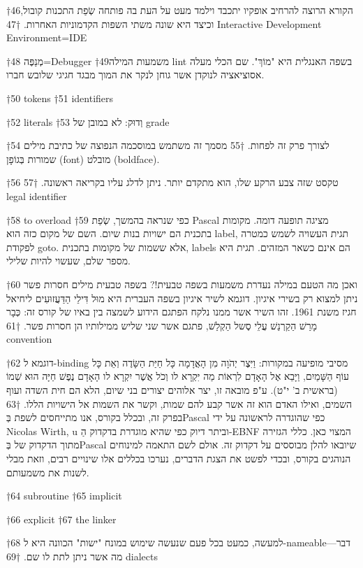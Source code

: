 †{46}הקורא הרוצה להרחיב אופקיו יתכבד וילמד מעט על העת בה פותחה שְׂפַת התכנות קובול, וכיצד היא שונה משתי השפות הקדמוניות האחרות.
†{47} Interactive Development Environment=IDE

†{48} מְנַפֶּה=Debugger
†{49}משמעות המילה lint בשפה האנגלית היא "מוֹךְ". שם הכלי מעלה אסוציאציה לנוקדן אשר גוחן לנקר את המוך מבגד חגיגי שלובש חברו.

†{50} tokens
†{51} identifiers

†{52} literals
†{53} וְדוּק: לא במובן של grade

†{54} לצורך פרק זה לפחות.
†{55} מסמך זה משתמש במוסכמה הנפוצה של כתיבת מילים שמורות בְּגוֹפָן (font) מובלט (boldface).

†{56} טקסט שזה צבע הרקע שלו, הוא מתקדם יותר. ניתן לדלג עליו בקריאה ראשונה.
†{57} legal identifier

†{58} to overload
†{59} כפי שנראה בהמשך, שְׂפַת Pascal מציגה תופעה דומה. מקומות בתכנית הם ישויות בנות שיום. השם של מקום כזה הוא label, תגית העשויה לשמש כמטרה לפקודת goto. אלא ששמות של מקומות בתכנית, labels הם אינם כשאר המזהים. תגית היא מספר שלם, שעשוי להיות שלילי.

†{60} ואכן מה הטעם במילה נעדרת משמעות בשפה טבעית!? בשפה טבעית מילים חסרות פשר ניתן למצוא רק בשירי איגיון. דוגמא לשיר איגיון בשפה העברית היא מוּל דִּילֵי הַדַּעֲזוּעִים ליחיאל חגיז משנת 1961. זהו השיר אשר ממנו נלקח הפתגם הידוע לשמצה בין באיו של קורס זה: כְּבָר מָרַשׁ הַקַרְנַשׁ עֲלֵי סֶשל הַקְלַשׁ, פתגם אשר שני שליש ממילותיו הן חסרות פשר.
†{61} convention

†{62} דוגמא ל-binding מסיבי מופיעה במקורות: וַיִּצֶר יְהֹוָה מִן הָאֲדָמָה כָּל חַיַּת הַשָּׂדֶה וְאֵת כָּל עוֹף הַשָּׁמַיִם, וַיָּבֵא אֶל הָאָדָם לִרְאוֹת מַה יִּקְרָא לו וְכֹל אֲשֶׁר יִקְרָא לו הָאָדָם נֶפֶשׁ חַיָּה הוּא שְׁמוֹ (בראשית ב' י"ט). ע"פ מובאה זו, יצר אלוהים יצורים בני שיום, הלא הם חית השדה ועוף השמים, ואילו האדם הוא זה אשר קבע להם שמות, וקשר את השמות אל הישויות הללו.
†{63} בפרק זה, ובכלל בקורס, אנו מתייחסים לשפת בְּPascal כפי שהוגדרה לראשונה על ידי Nicolas Wirth, u וביתר דיוק כפי שהיא מוגדרת בדקדוק הַ-EBNF המצוי כאן. כללי הגזירה מתוך הדקדוק של בְּPascal שיובאו להלן מבוססים על דקדוק זה. אולם לשם התאמה למינוחים הנוהגים בקורס, ובכדי לפשט את הצגת הדברים, נערכו בכללים אלו שינויים רבים, וזאת מבלי לשנות את משמעותם.

†{64} subroutine
†{65} implicit

†{66} explicit
†{67} the linker

†{68} למעשה, כמעט בכל פעם שנעשה שימוש במונח "ישות" הכוונה היא ל-nameable---דבר מה אשר ניתן לתת לו שם.
†{69} dialects

